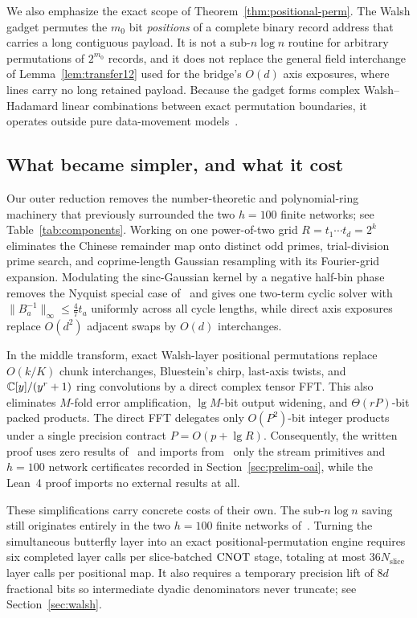 We also emphasize the exact scope of Theorem~\ref{thm:positional-perm}. The Walsh gadget permutes the $m_0$ bit \emph{positions} of a complete binary record address that carries a long contiguous payload. It is not a sub-$n\log n$ routine for arbitrary permutations of $2^{m_0}$ records, and it does not replace the general field interchange of Lemma~\ref{lem:transfer12} used for the bridge's $O(d)$ axis exposures, where lines carry no long retained payload. Because the gadget forms complex Walsh--Hadamard linear combinations between exact permutation boundaries, it operates outside pure data-movement models~\cite[\S1.4]{HvdH25}.

\subsection{What became simpler, and what it cost}\label{sec:disc-simpler}

Our outer reduction removes the number-theoretic and polynomial-ring machinery that previously surrounded the two $h=100$ finite networks; see Table~\ref{tab:components}. Working on one power-of-two grid $R=t_1\cdots t_d=2^k$ eliminates the Chinese remainder map onto distinct odd primes, trial-division prime search, and coprime-length Gaussian resampling with its Fourier-grid expansion. Modulating the sinc-Gaussian kernel by a negative half-bin phase removes the Nyquist special case of~\cite{MS} and gives one two-term cyclic solver with $\|B_a^{-1}\|_\infty\le\frac47 t_a$ uniformly across all cycle lengths, while direct axis exposures replace $O(d^2)$ adjacent swaps by $O(d)$ interchanges.

In the middle transform, exact Walsh-layer positional permutations replace $O(k/K)$ chunk interchanges, Bluestein's chirp, last-axis twists, and $\mathbb{C}[y]/(y^r+1)$ ring convolutions by a direct complex tensor FFT. This also eliminates $M$-fold error amplification, $\lg M$-bit output widening, and $\Theta(rP)$-bit packed products. The direct FFT delegates only $O(P^2)$-bit integer products under a single precision contract $P=O(p+\lg R)$. Consequently, the written proof uses zero results of~\cite{HvdH21} and imports from~\cite{OAI26} only the stream primitives and $h=100$ network certificates recorded in Section~\ref{sec:prelim-oai}, while the Lean~4 proof imports no external results at all.

These simplifications carry concrete costs of their own. The sub-$n\log n$ saving still originates entirely in the two $h=100$ finite networks of~\cite{OAI26}. Turning the simultaneous butterfly layer into an exact positional-permutation engine requires six completed layer calls per slice-batched $\mathrm{CNOT}$ stage, totaling at most $36 N_{\mathrm{slice}}$ layer calls per positional map. It also requires a temporary precision lift of $8d$ fractional bits so intermediate dyadic denominators never truncate; see Section~\ref{sec:walsh}.

